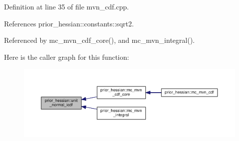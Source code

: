 Definition at line 35 of file mvn\+\_\+cdf.\+cpp.



References prior\+\_\+hessian\+::constants\+::sqrt2.



Referenced by mc\+\_\+mvn\+\_\+cdf\+\_\+core(), and mc\+\_\+mvn\+\_\+integral().



Here is the caller graph for this function\+:\nopagebreak
\begin{figure}[H]
\begin{center}
\leavevmode
\includegraphics[width=350pt]{namespaceprior__hessian_ab76971b5aff40010d5c63fba454349b9_icgraph}
\end{center}
\end{figure}


